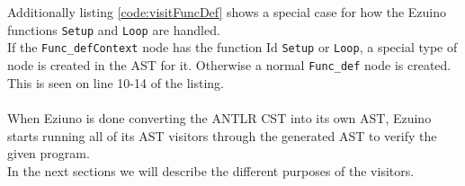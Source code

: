 \\\\
Additionally listing \ref{code:visitFuncDef} shows a special case for how the Ezuino functions \texttt{Setup} and \texttt{Loop} are handled.\\
If the \texttt{Func\_defContext} node has the function Id \texttt{Setup} or \texttt{Loop}, a special type of node is created in the AST for it. Otherwise a normal \texttt{Func\_def} node is created. This is seen on line 10-14 of the listing.
\\\\
When Eziuno is done converting the ANTLR CST into its own AST, Ezuino starts running all of its AST visitors through the generated AST to verify the given program.\\
In the next sections we will describe the different purposes of the visitors.\\
